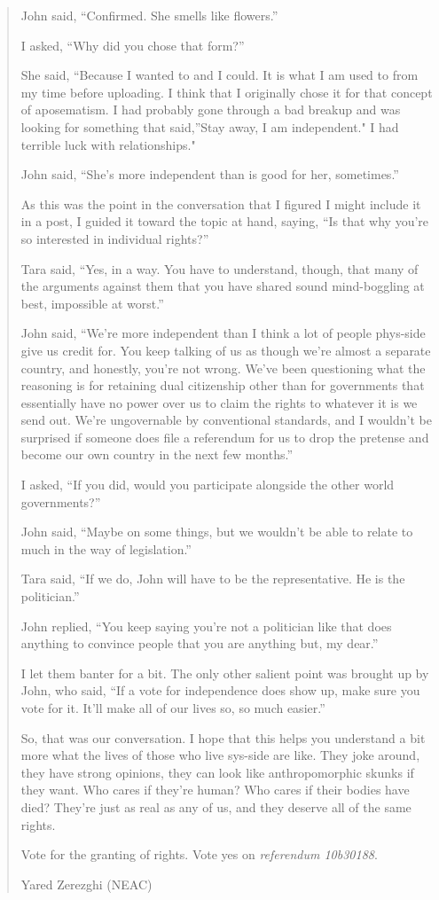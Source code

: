 \begin{quote}
John said, ``Confirmed. She smells like flowers.''

I asked, ``Why did you chose that form?''

She said, ``Because I wanted to and I could. It is what I am used to from my time before uploading. I think that I originally chose it for that concept of aposematism. I had probably gone through a bad breakup and was looking for something that said,''Stay away, I am independent." I had terrible luck with relationships."

John said, ``She's more independent than is good for her, sometimes.''

As this was the point in the conversation that I figured I might include it in a post, I guided it toward the topic at hand, saying, ``Is that why you're so interested in individual rights?''

Tara said, ``Yes, in a way. You have to understand, though, that many of the arguments against them that you have shared sound mind-boggling at best, impossible at worst.''

John said, ``We're more independent than I think a lot of people phys-side give us credit for. You keep talking of us as though we're almost a separate country, and honestly, you're not wrong. We've been questioning what the reasoning is for retaining dual citizenship other than for governments that essentially have no power over us to claim the rights to whatever it is we send out. We're ungovernable by conventional standards, and I wouldn't be surprised if someone does file a referendum for us to drop the pretense and become our own country in the next few months.''

I asked, ``If you did, would you participate alongside the other world governments?''

John said, ``Maybe on some things, but we wouldn't be able to relate to much in the way of legislation.''

Tara said, ``If we do, John will have to be the representative. He is the politician.''

John replied, ``You keep saying you're not a politician like that does anything to convince people that you are anything but, my dear.''

I let them banter for a bit. The only other salient point was brought up by John, who said, ``If a vote for independence does show up, make sure you vote for it. It'll make all of our lives so, so much easier.''

So, that was our conversation. I hope that this helps you understand a bit more what the lives of those who live sys-side are like. They joke around, they have strong opinions, they can look like anthropomorphic skunks if they want. Who cares if they're human? Who cares if their bodies have died? They're just as real as any of us, and they deserve all of the same rights.

Vote for the granting of rights. Vote yes on \emph{referendum 10b30188}.

Yared Zerezghi (NEAC)
\end{quote}

